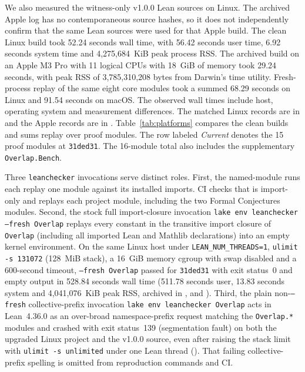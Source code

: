 \documentclass[sigplan,10pt,anonymous,review,balance=false]{acmart}
\newcommand{\leanid}[1]{\texttt{#1}}
\begin{document}
We also measured the witness-only v1.0.0 Lean sources on Linux.
The archived Apple log has no contemporaneous source hashes, so it
does not independently confirm that the same Lean sources were used
for that Apple build. The clean Linux build took 52.24 seconds wall time, with 56.42
seconds user time, 6.92 seconds system time and 4,275,684~KiB
peak process RSS. The archived build on an Apple M3 Pro with 11 logical CPUs
with 18~GiB of memory took 29.24 seconds, with peak RSS of
3,785,310,208 bytes from Darwin's time utility. Fresh-process
replay of the same eight core modules took a summed 68.29 seconds
on Linux and 91.54 seconds on macOS. The observed wall times include host, operating
system and measurement differences. The matched Linux records are
in  and the
Apple records are in .
Table~\ref{tab:platforms} compares the clean builds and sums
replay over proof modules. The row labeled \emph{Current} denotes the
15 proof modules at \texttt{31ded31}. The 16-module total also includes the supplementary
\leanid{Overlap.Bench}.



Three \leanid{leanchecker} invocations serve distinct roles. First,
the named-module runs each replay one module against its installed
imports. CI checks that  is import-only and replays
each project module, including the two Formal Conjectures modules.
Second, the stock full import-closure invocation
\leanid{lake env leanchecker} \leanid{--fresh Overlap} replays every
constant in the transitive import closure of \leanid{Overlap} (including
all imported Lean and Mathlib declarations) into an empty kernel
environment. On the same Linux host under \leanid{LEAN\_NUM\_THREADS=1},
\leanid{ulimit -s 131072} (128~MiB stack), a 16~GiB memory cgroup with
swap disabled and a 600-second timeout, \leanid{--fresh Overlap}
passed for \texttt{31ded31} with exit status~0 and empty output in 528.84
seconds wall time
(511.78 seconds user, 13.83 seconds system and 4,041,076~KiB peak RSS,
archived in ,
 and ). Third, the plain
non-\leanid{--fresh} collective-prefix invocation
\leanid{lake env leanchecker Overlap} acts in Lean~4.36.0 as an
over-broad namespace-prefix request matching the \leanid{Overlap.*}
modules and crashed with exit status~139 (segmentation fault) on both
the upgraded Linux project and the v1.0.0 source, even after raising
the stack limit with \leanid{ulimit -s unlimited} under one Lean
thread (). That failing
collective-prefix spelling is omitted from reproduction commands and
CI.
\end{document}
